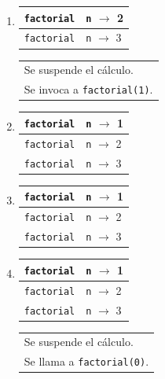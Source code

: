 \begin{enumerate}
\item {}
	\begin{tabular}{r|l|}
	\hline
	\currentframe \verb|factorial| & \verb|n| $\rightarrow$ 2 \\
	\hline
	\hline
	              \verb|factorial| & \verb|n| $\rightarrow$ 3 \\
	\hline
	\end{tabular}
	\begin{tabular}{l}
	Se suspende el cálculo. \\
	Se invoca a \verb|factorial(1)|.
	\end{tabular}

\item {}
	\begin{tabular}{r|l|}
	\hline
	\currentframe \verb|factorial| & \verb|n| $\rightarrow$ 1 \\
	\hline
	\hline
	              \verb|factorial| & \verb|n| $\rightarrow$ 2 \\
	\hline
	\hline
	              \verb|factorial| & \verb|n| $\rightarrow$ 3 \\
	\hline
	\end{tabular}

\item {}
	\begin{tabular}{r|l|}
	\hline
	\currentframe \verb|factorial| & \verb|n| $\rightarrow$ 1 \\
	\hline
	\hline
	              \verb|factorial| & \verb|n| $\rightarrow$ 2 \\
	\hline
	\hline
	              \verb|factorial| & \verb|n| $\rightarrow$ 3 \\
	\hline
	\end{tabular}

\item {}
	\begin{tabular}{r|l|}
	\hline
	\currentframe \verb|factorial| & \verb|n| $\rightarrow$ 1 \\
	\hline
	\hline
	              \verb|factorial| & \verb|n| $\rightarrow$ 2 \\
	\hline
	\hline
	              \verb|factorial| & \verb|n| $\rightarrow$ 3 \\
	\hline
	\end{tabular}
	\begin{tabular}{l}
	Se suspende el cálculo. \\
	Se llama a \verb|factorial(0)|.
	\end{tabular}


\end{enumerate}
